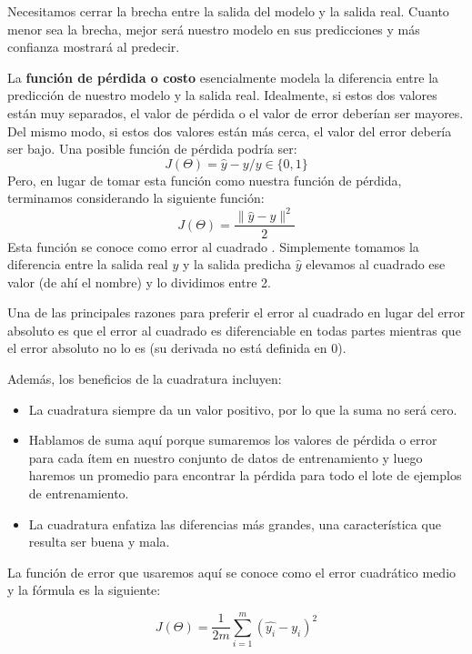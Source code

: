 \documentclass[a4paper,12pt]{article}
\begin{document}
Necesitamos cerrar la brecha entre la salida del modelo y la salida real. Cuanto menor sea la brecha, mejor será nuestro modelo en sus predicciones y más confianza mostrará al predecir.

La \textbf{función de pérdida o costo} esencialmente modela la diferencia entre la predicción de nuestro modelo y la salida real. Idealmente, si estos dos valores están muy separados, el valor de pérdida o el valor de error deberían ser mayores. Del mismo modo, si estos dos valores están más cerca, el valor del error debería ser bajo.
Una posible función de pérdida podría ser:
\begin{equation}
	J(\Theta)=\hat{y}-y / y\in\{0,1\}
\end{equation}
Pero, en lugar de tomar esta función como nuestra función de pérdida, terminamos considerando la siguiente función:
\begin{equation}
	J(\Theta)=\frac{\|\hat{y}-y\|^2}{2}
\end{equation}
Esta función se conoce como error al cuadrado . Simplemente tomamos la diferencia entre la salida real $y$ y la salida predicha $\hat{y}$ elevamos al cuadrado ese valor (de ahí el nombre) y lo dividimos entre 2.

Una de las principales razones para preferir el error al cuadrado en lugar del error absoluto es que el error al cuadrado es diferenciable en todas partes mientras que el error absoluto no lo es (su derivada no está definida en 0).

Además, los beneficios de la cuadratura incluyen:
\begin{itemize}[noitemsep, topsep=2pt]
	\item La cuadratura siempre da un valor positivo, por lo que la suma no será cero.
	\item Hablamos de suma aquí porque sumaremos los valores de pérdida o error para cada ítem en nuestro conjunto de datos de entrenamiento y luego haremos un promedio para encontrar la pérdida para todo el lote de ejemplos de entrenamiento.
	\item La cuadratura enfatiza las diferencias más grandes, una característica que resulta ser buena y mala.
\end{itemize}

La función de error que usaremos aquí se conoce como el error cuadrático medio y la fórmula es la siguiente:

\begin{equation}
	J(\Theta)=\frac{1}{2m} \sum_{i=1}^{m} (\hat{y_i}-y_i)^2
	\label{funcperdida}
\end{equation}
\end{document}
